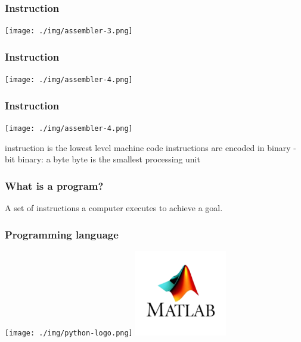 \documentclass[11pt]{beamer}
\begin{document}
\begin{frame}[fragile]
  \frametitle{Instruction}

  \texttt{[image: ./img/assembler-3.png]}
\end{frame}

\begin{frame}[fragile]
  \frametitle{Instruction}

  \texttt{[image: ./img/assembler-4.png]}
\end{frame}

\fi



\begin{frame}[fragile]
  \frametitle{Instruction}

  \texttt{[image: ./img/assembler-4.png]}\pause
  \begin{itemize}
    \myitem instruction is the lowest level machine code %
    \myitem instructions are encoded in binary
    -bit binary: a byte
    \myitem byte is the smallest processing unit
  \end{itemize}
\end{frame}


\begin{frame}
  \frametitle{What is a program?}
  \Enlarge

  \begin{itemize} \pause
    \myitem A set of instructions a computer executes to achieve a goal.
  \end{itemize}
\end{frame}


\begin{frame}[fragile]
  \frametitle{Programming language}

  \texttt{[image: ./img/python-logo.png]} \hspace{5mm}
  \includegraphics[width=0.3\textwidth]{./img/matlab.png}  \\
  \hspace{5mm}{\small Python}
\end{frame}
\end{document}
